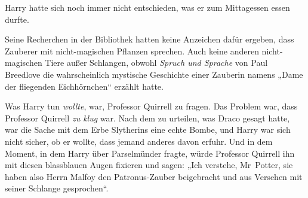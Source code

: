 Harry hatte sich noch immer nicht entschieden, was er zum Mittagessen essen durfte.

Seine Recherchen in der Bibliothek hatten keine Anzeichen dafür ergeben, dass Zauberer mit nicht-magischen Pflanzen sprechen. Auch keine anderen nicht-magischen Tiere außer Schlangen, obwohl \emph{Spruch und Sprache} von Paul Breedlove die wahrscheinlich mystische Geschichte einer Zauberin namens
„Dame der fliegenden Eichhörnchen“ erzählt hatte.

Was Harry tun \emph{wollte}, war, Professor Quirrell zu fragen. Das Problem war, dass Professor Quirrell \emph{zu klug} war. Nach dem zu urteilen, was Draco gesagt hatte, war die Sache mit dem Erbe Slytherins eine echte Bombe, und Harry war sich nicht sicher, ob er wollte, dass jemand anderes davon erfuhr. Und in dem Moment, in dem Harry über Parselmünder fragte, würde Professor Quirrell ihn mit diesen blassblauen Augen fixieren und sagen:
„Ich verstehe, Mr~Potter, sie haben also Herrn Malfoy den Patronus-Zauber beigebracht und aus Versehen mit seiner Schlange gesprochen“.

